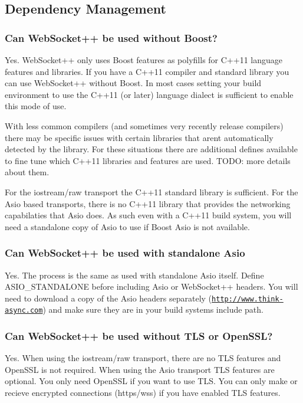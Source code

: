 \subsection*{Dependency Management}

\subsubsection*{Can Web\+Socket++ be used without Boost?}

Yes. Web\+Socket++ only uses Boost features as polyfills for C++11 language features and libraries. If you have a C++11 compiler and standard library you can use Web\+Socket++ without Boost. In most cases setting your build environment to use the C++11 (or later) language dialect is sufficient to enable this mode of use.

With less common compilers (and sometimes very recently release compilers) there may be specific issues with certain libraries that aren\textquotesingle{}t automatically detected by the library. For these situations there are additional defines available to fine tune which C++11 libraries and features are used. T\+O\+DO\+: more details about them.

For the iostream/raw transport the C++11 standard library is sufficient. For the Asio based transports, there is no C++11 library that provides the networking capabilaties that Asio does. As such even with a C++11 build system, you will need a standalone copy of Asio to use if Boost Asio is not available.

\subsubsection*{Can Web\+Socket++ be used with standalone Asio}

Yes. The process is the same as used with standalone Asio itself. Define {\ttfamily A\+S\+I\+O\+\_\+\+S\+T\+A\+N\+D\+A\+L\+O\+NE} before including Asio or Web\+Socket++ headers. You will need to download a copy of the Asio headers separately (\href{http://www.think-async.com}{\tt http\+://www.\+think-\/async.\+com}) and make sure they are in your build system\textquotesingle{}s include path.

\subsubsection*{Can Web\+Socket++ be used without T\+LS or Open\+S\+SL?}

Yes. When using the iostream/raw transport, there are no T\+LS features and Open\+S\+SL is not required. When using the Asio transport T\+LS features are optional. You only need Open\+S\+SL if you want to use T\+LS. You can only make or recieve encrypted connections (https/wss) if you have enabled T\+LS features.

